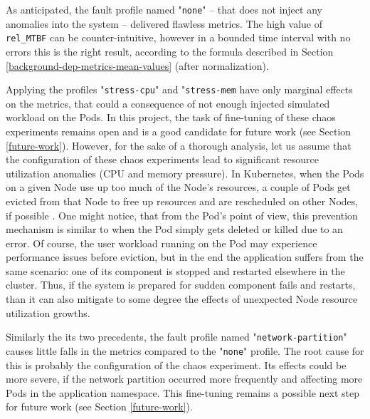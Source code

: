 As anticipated, the fault profile named "\texttt{none}" -- that does not inject any anomalies into the system -- delivered flawless metrics. The high value of \texttt{rel\_MTBF} can be counter-intuitive, however in a bounded time interval with no errors this is the right result, according to the formula described in Section \ref{background-dep-metrics-mean-values} (after normalization).

Applying the profiles "\texttt{stress-cpu}" and "\texttt{stress-mem} have only marginal effects on the metrics, that could a consequence of not enough injected simulated workload on the Pods. In this project, the task of fine-tuning of these chaos experiments remains open and is a good candidate for future work (see Section \ref{future-work}). However, for the sake of a thorough analysis, let us assume that the configuration of these chaos experiments lead to significant resource utilization anomalies (CPU and memory pressure). In Kubernetes, when the Pods on a given Node use up too much of the Node's resources, a couple of Pods get evicted from that Node to free up resources and are rescheduled on other Nodes, if possible \cite{KubernetesNodePressureEviction}. One might notice, that from the Pod's point of view, this prevention mechanism is similar to when the Pod simply gets deleted or killed due to an error. Of course, the user workload running on the Pod may experience performance issues before eviction, but in the end the application suffers from the same scenario: one of its component is stopped and restarted elsewhere in the cluster. Thus, if the system is prepared for sudden component fails and restarts, than it can also mitigate to some degree the effects of unexpected Node resource utilization growths.

Similarly the its two precedents, the fault profile named "\texttt{network-partition}" causes little falls in the metrics compared to the "\texttt{none}" profile. The root cause for this is probably the configuration of the chaos experiment. Its effects could be more severe, if the network partition occurred more frequently and affecting more Pods in the application namespace. This fine-tuning remains a possible next step for future work (see Section \ref{future-work}).

